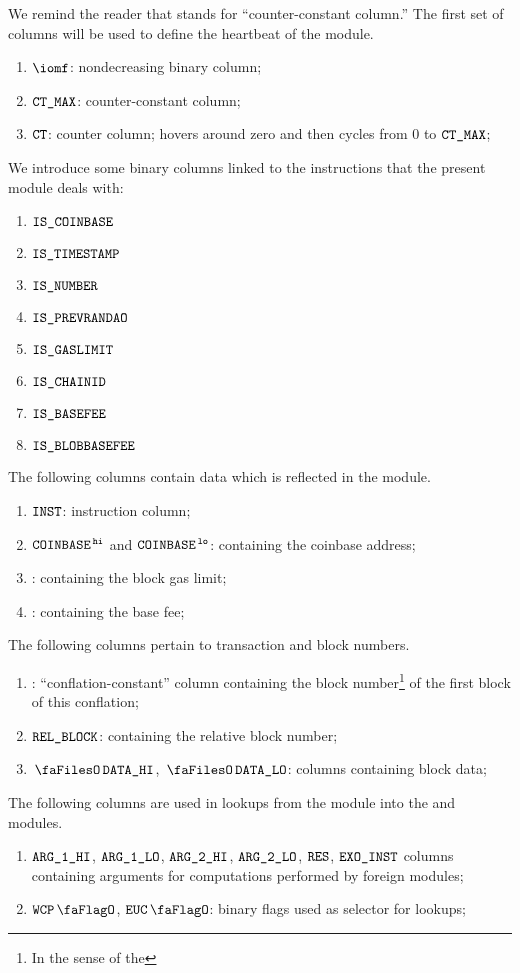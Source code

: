 We remind the reader that \ccc{} stands for ``counter-constant column.''
The first set of columns will be used to define the heartbeat of the \btcMod{} module.
\begin{enumerate}
	\item $\iomf$:
		nondecreasing binary column;
	\item $\texttt{CT\_MAX}$:
		counter-constant column;
	\item $\texttt{CT}$:
		counter column; hovers around zero and then cycles from $0$ to $\texttt{CT\_MAX}$;
\end{enumerate}
We introduce some binary columns linked to the instructions that the present module deals with:
\begin{multicols}{3}
	\begin{enumerate}[resume]
		\item $\texttt{IS\_COINBASE}$
		\item $\texttt{IS\_TIMESTAMP}$
		\item $\texttt{IS\_NUMBER}$
		\item $\texttt{IS\_PREVRANDAO}$
		\item $\texttt{IS\_GASLIMIT}$
		\item $\texttt{IS\_CHAINID}$
		\item $\texttt{IS\_BASEFEE}$
		\item $\texttt{IS\_BLOBBASEFEE}$
	\end{enumerate}
\end{multicols}
\noindent The following columns contain data which is reflected in the \userTxnDataMod{} module.
\begin{enumerate}[resume, start=13]
	\item $\texttt{INST}$:
		instruction column;
	\item $\texttt{COINBASE}^{\mathtt{\,hi}}$ and $\texttt{COINBASE}^{\mathtt{\,lo}}$:
		\ccc{} containing the
		coinbase address;
	\item \blockGasLimit{}:
		\ccc{} containing the
		block gas limit;
	\item \basefee{}:
		\ccc{} containing the
		base fee;
\end{enumerate}
The following columns pertain to transaction and block numbers.
\begin{enumerate}[resume]
	\item \blockNumberOfFirstBlockInConflation{}:
		``conflation-constant'' column containing the block number\footnote{In the sense of the \evm{}} of the first block of this conflation;
	\item $\texttt{REL\_BLOCK}$:
		\ccc{} containing the relative block number;
	\item $\blockDataHi$, $\blockDataLo$:
		columns containing block data;
\end{enumerate}
The following columns are used in lookups from the \btcMod{} module into the \wcpMod{} and \eucMod{} modules.
\begin{enumerate}[resume]
	\item $\texttt{ARG}\texttt{\_1}\texttt{\_HI}$, $\texttt{ARG}\texttt{\_1}\texttt{\_LO}$, $\texttt{ARG}\texttt{\_2}\texttt{\_HI}$, $\texttt{ARG}\texttt{\_2}\texttt{\_LO}$, $\texttt{RES}$, $\texttt{EXO\_INST}$
		columns containing arguments for computations performed by foreign modules;
	\item $\wcpFlag$, $\eucFlag$:
		binary flags used as selector for lookups;
\end{enumerate}
